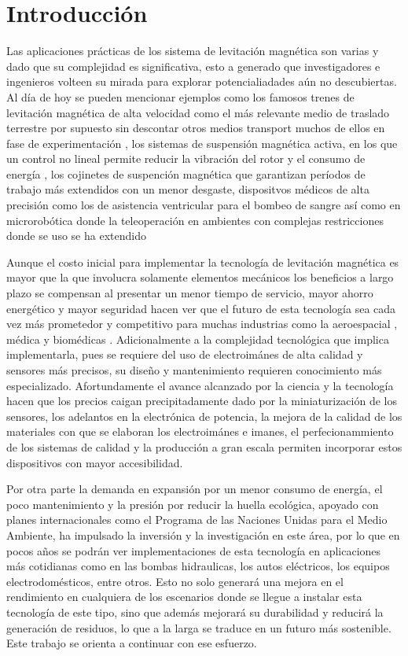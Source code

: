 \chapter{Introducción}
Las aplicaciones prácticas de los sistema de levitación magnética son varias y dado que su complejidad es significativa, 
esto a generado que investigadores e ingenieros volteen su mirada para explorar potencialiadades aún no descubiertas. Al día de hoy se pueden mencionar
ejemplos como los famosos trenes de levitación magnética de alta velocidad \cite{mingda} como el más relevante medio de 
traslado terrestre por supuesto sin descontar otros medios transport muchos de ellos en fase de experimentación \cite{hyung},
los sistemas de suspensión magnética activa, en los que un control no lineal permite reducir la vibración del rotor y el consumo de energía \cite{charara}, 
los cojinetes de suspención magnética que garantizan períodos de trabajo más extendidos con un menor desgaste\cite{debarghya}, 
dispositvos médicos de alta precisión como los de asistencia ventricular para el bombeo de sangre \cite{gang1} así como en microrobótica
donde la teleoperación en ambientes con complejas restricciones donde se uso se ha extendido \cite{mir}

Aunque el costo inicial para implementar la tecnología de levitación magnética es mayor que la que involucra solamente elementos mecánicos 
los beneficios a largo plazo se compensan al presentar un menor tiempo de servicio, mayor ahorro energético y mayor seguridad hacen ver que el futuro de esta tecnología sea cada vez 
más prometedor y competitivo para muchas industrias como la aeroespacial \cite{bryton}, médica \cite{song} y biomédicas \cite{sajjad}. Adicionalmente a la complejidad tecnológica
que implica implementarla, pues se requiere del uso de electroimánes de alta calidad y sensores más precisos, su diseño y mantenimiento requieren conocimiento
más especializado. Afortundamente el avance alcanzado por la ciencia y la tecnología hacen que los precios caigan precipitadamente dado por la miniaturización de los sensores, los adelantos 
en la electrónica de potencia, la mejora de la calidad de los materiales con que se elaboran los electroimánes e imanes, el perfecionammiento de los sistemas de calidad y la producción a gran escala permiten incorporar
estos dispositivos con mayor accesibilidad.

Por otra parte la demanda en expansión por un menor consumo de energía, el poco mantenimiento y la presión por reducir la huella ecológica, apoyado con planes internacionales como el Programa de las Naciones Unidas
para el Medio Ambiente, ha impulsado la inversión y la investigación en este área, por lo que en pocos años se podrán ver implementaciones de esta tecnología en aplicaciones más cotidianas como en las
bombas hidraulicas, los autos eléctricos, los equipos electrodomésticos, entre otros. Esto no solo generará una mejora en el rendimiento en cualquiera de los escenarios donde se llegue a instalar esta tecnología de este tipo, 
sino que además mejorará su durabilidad y reducirá la generación de residuos, lo que a la larga se traduce en un futuro más sostenible. Este trabajo se orienta a continuar con ese esfuerzo.

